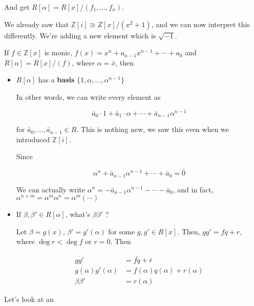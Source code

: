 \documentclass[12pt]{article}
\def\Z{{\mathbb Z}}
\theoremstyle{remark}
\theoremstyle{remark}
\theoremstyle{remark}
\theoremstyle{remark}
\theoremstyle{remark}
\begin{document}
And get $R[\alpha] = R[x] / (f_1, \dots, f_n)$.

We already saw that $\Z[i] \cong Z[x] / (x^2 + 1)$, and we can now interpret
this differently. We're adding a new element which is $\sqrt{-1}$.

If $f \in \Z[x]$ is monic, $f(x) = x^n + a_{n - 1} x^{n - 1} + \cdots + a_0$ and
$R[\alpha] = R[x] / (f)$, where $\alpha = \bar x$, then

\begin{itemize}
  \item $R[\alpha]$ has a {\bf basis} $\{1, \alpha, \dots, \alpha^{n - 1}\}$

    In other words, we can write every element as

    \[
      \bar a_0 \cdot 1 + \bar a_1 \cdot \alpha + \cdots + \bar a_{n - 1} \alpha^{n - 1}
    \]

    for $\bar a_0, \dots, \bar a_{n - 1} \in R$. This is nothing new, we saw
    this even when we introduced $\Z[i]$.

    Since 

    \[
      \alpha^n + \bar a_{n - 1} \alpha^{n - 1} + \cdots + \bar a_0 = \bar 0
    \]

    We can actually write $\alpha^n = -\bar a_{n - 1} \alpha^{n - 1} - \cdots -
    \bar a_0$, and in fact, $\alpha^{n + m} = \alpha^m \alpha^n = \alpha^m (\cdots)$

  \item If $\beta, \beta' \in R[\alpha]$, what's $\beta \beta'$ ?

    Let $\beta = g(x)$, $\beta' = g'(\alpha)$ for some $g, g' \in R[x]$. Then,
    $gg' = fq + r$, where $\deg r < \deg f$ or $r = 0$. Then 

    \begin{align*}
      \overline{gg'} &= \overline{fq} + \bar r \\
      g(\alpha)g'(\alpha) &= f(\alpha)q(\alpha) + r(\alpha) \\
      \beta \beta' &= r(\alpha)
    \end{align*}
\end{itemize}

Let's look at an
\end{document}
